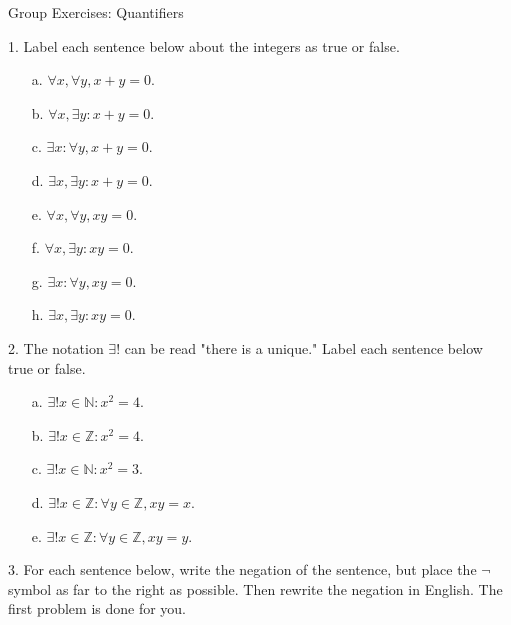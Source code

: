 \documentclass[10pt]{beamer}
\begin{document}
\begin{frame}{Group Exercises: Quantifiers}

\footnotesize 
\begin{minipage}{0.56\textwidth}
    1. Label each sentence below about the integers as true or false. 
    \begin{itemize}
        \item[a.] $\forall x, \forall y, x+y=0.$ 
        \item[b.] $\forall x, \exists y: x+y=0.$
        \item[c.] $\exists x: \forall y, x+y=0.$
        \item[d.] $\exists x, \exists y: x+y=0.$
        \item[e.] $\forall x, \forall y, xy=0.$
        \item[f.] $\forall x, \exists y: xy=0.$
        \item[g.] $\exists x: \forall y, xy=0.$
        \item[h.] $\exists x, \exists y: xy=0.$
    \end{itemize}
    2. The notation $\exists!$ can be read "there is a unique." Label each sentence below true or false.
    \vspace{-0.5cm}
    \begin{itemize}
        \item[a.] $\exists! x \in \mathbb{N}: x^2=4.$ 
        \item[b.] $\exists! x \in \mathbb{Z}: x^2=4.$ 
        \item[c.] $\exists! x \in \mathbb{N}: x^2=3.$ 
        \item[d.] $\exists! x \in \mathbb{Z}: \forall y \in \mathbb{Z}, xy=x.$ 
        \item[e.] $\exists! x \in \mathbb{Z}: \forall y \in \mathbb{Z}, xy=y.$ 
    \end{itemize}
\end{minipage}
\hfill
\begin{minipage}{0.38\textwidth}
    3. For each sentence below, write the negation of the sentence, but place the $\lnot$ symbol as far to the right as possible. Then rewrite the negation in English.  The first problem is done for you.
    \begin{itemize}
    

\end{itemize}
\end{minipage}
\end{frame}
\end{document}

